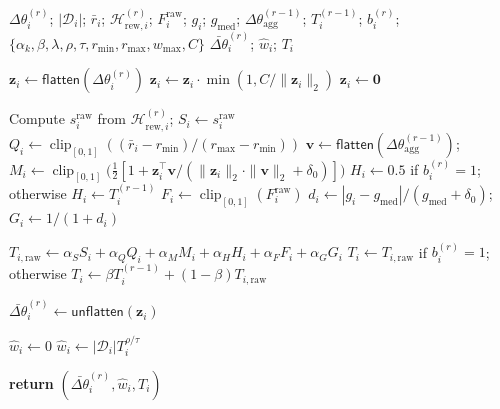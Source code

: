 \documentclass{article}
\begin{document}
\begin{algorithm}[H]
  \caption{\textsc{TrustScore} for client $i$}
  \label{alg:trust_score}
  \begin{algorithmic}[1]
  \REQUIRE $\Delta\theta_i^{(r)}$; $|\mathcal{D}_i|$; $\bar r_i$;
  $\mathcal H_{\mathrm{rew},i}^{(r)}$; $F_i^{\mathrm{raw}}$; $g_i$;
  $g_{\mathrm{med}}$; $\Delta\theta_{\mathrm{agg}}^{(r-1)}$;
  $T_i^{(r-1)}$; $b_i^{(r)}$;
  $\{\alpha_k,\beta,\lambda,\rho,\tau,r_{\min},r_{\max},w_{\max},C\}$
  \ENSURE $\bar{\Delta\theta}_i^{(r)}$; $\hat w_i$; $T_i$

  \STATE $\mathbf{z}_i\leftarrow\mathsf{flatten}(\Delta\theta_i^{(r)})$
    \STATE $\mathbf{z}_i\leftarrow
    \mathbf{z}_i\cdot\min(1,C/\|\mathbf{z}_i\|_2)$
  \ELSE
    \STATE $\mathbf{z}_i\leftarrow\mathbf0$
  \ENDIF

  \STATE Compute $s_i^{\mathrm{raw}}$ from
  $\mathcal H_{\mathrm{rew},i}^{(r)}$;
  $S_i\leftarrow s_i^{\mathrm{raw}}$
  \STATE $Q_i\leftarrow\operatorname{clip}_{[0,1]}
  ((\bar r_i-r_{\min})/(r_{\max}-r_{\min}))$
  \STATE $\mathbf v\leftarrow
  \mathsf{flatten}(\Delta\theta_{\mathrm{agg}}^{(r-1)})$;
  $M_i\leftarrow\operatorname{clip}_{[0,1]}\bigl(
  \tfrac{1}{2}[1+\mathbf{z}_i^\top\mathbf v/
  (\|\mathbf{z}_i\|_2\cdot\|\mathbf v\|_2+\delta_0)]\bigr)$
  \STATE $H_i\leftarrow0.5$ if $b_i^{(r)}=1$; otherwise
  $H_i\leftarrow T_i^{(r-1)}$
  \STATE $F_i\leftarrow\operatorname{clip}_{[0,1]}(F_i^{\mathrm{raw}})$
  \STATE $d_i\leftarrow|g_i-g_{\mathrm{med}}|/
  (g_{\mathrm{med}}+\delta_0)$;
  $G_i\leftarrow1/(1+d_i)$

  \STATE $T_{i,\mathrm{raw}}\leftarrow
  \alpha_S S_i+\alpha_Q Q_i+\alpha_M M_i+\alpha_H H_i+\alpha_F F_i+\alpha_G G_i$
  \STATE $T_i\leftarrow T_{i,\mathrm{raw}}$ if $b_i^{(r)}=1$; otherwise
  $T_i\leftarrow\beta T_i^{(r-1)}+(1-\beta)T_{i,\mathrm{raw}}$

  \STATE $\bar{\Delta\theta}_i^{(r)}
  \leftarrow\mathsf{unflatten}(\mathbf{z}_i)$

  \STATE $\hat w_i\leftarrow0$
  \ELSE
  \STATE $\hat w_i\leftarrow|\mathcal{D}_i|T_i^{\rho/\tau}$
  \ENDIF

  \STATE \textbf{return}
  $(\bar{\Delta\theta}_i^{(r)},\hat w_i,T_i)$
  \end{algorithmic}
\end{algorithm}
\end{document}
